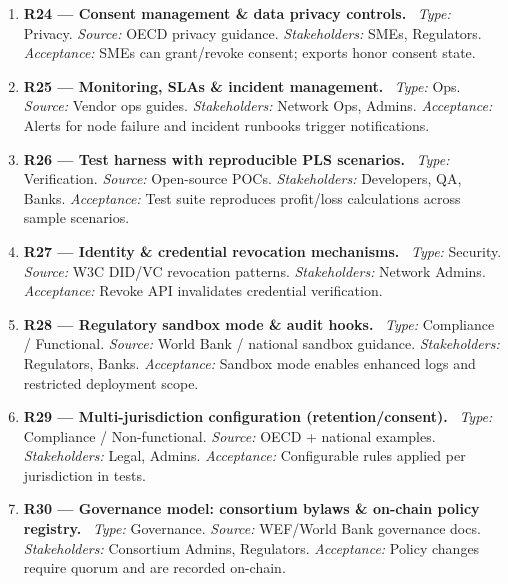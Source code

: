 \documentclass[11pt,a4paper]{article}
\begin{document}
\begin{enumerate}[label=R\arabic*:,leftmargin=*,itemsep=6pt]
\textit{Type:} Integration. \textit{Source:} Vendor integration guides. \textit{Stakeholders:} Buyers, SMEs. \textit{Acceptance:} Adapter mapping passes sample PO/invoice integration tests.
\item \textbf{R24 — Consent management \& data privacy controls.} \
\textit{Type:} Privacy. \textit{Source:} OECD privacy guidance. \textit{Stakeholders:} SMEs, Regulators. \textit{Acceptance:} SMEs can grant/revoke consent; exports honor consent state.
\item \textbf{R25 — Monitoring, SLAs \& incident management.} \
\textit{Type:} Ops. \textit{Source:} Vendor ops guides. \textit{Stakeholders:} Network Ops, Admins. \textit{Acceptance:} Alerts for node failure and incident runbooks trigger notifications.
\item \textbf{R26 — Test harness with reproducible PLS scenarios.} \
\textit{Type:} Verification. \textit{Source:} Open-source POCs. \textit{Stakeholders:} Developers, QA, Banks. \textit{Acceptance:} Test suite reproduces profit/loss calculations across sample scenarios.
\item \textbf{R27 — Identity \& credential revocation mechanisms.} \
\textit{Type:} Security. \textit{Source:} W3C DID/VC revocation patterns. \textit{Stakeholders:} Network Admins. \textit{Acceptance:} Revoke API invalidates credential verification.
\item \textbf{R28 — Regulatory sandbox mode \& audit hooks.} \
\textit{Type:} Compliance / Functional. \textit{Source:} World Bank / national sandbox guidance. \textit{Stakeholders:} Regulators, Banks. \textit{Acceptance:} Sandbox mode enables enhanced logs and restricted deployment scope.
\item \textbf{R29 — Multi-jurisdiction configuration (retention/consent).} \
\textit{Type:} Compliance / Non-functional. \textit{Source:} OECD + national examples. \textit{Stakeholders:} Legal, Admins. \textit{Acceptance:} Configurable rules applied per jurisdiction in tests.
\item \textbf{R30 — Governance model: consortium bylaws \& on-chain policy registry.} \
\textit{Type:} Governance. \textit{Source:} WEF/World Bank governance docs. \textit{Stakeholders:} Consortium Admins, Regulators. \textit{Acceptance:} Policy changes require quorum and are recorded on-chain.
\end{enumerate}
\end{document}

